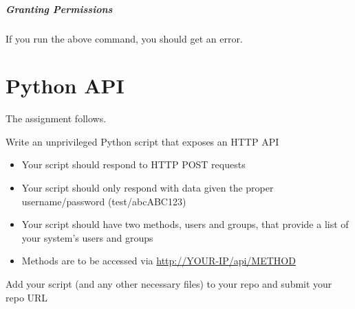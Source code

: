 \documentclass{article}
\begin{document}
\subparagraph{Granting Permissions}

If you run the above command, you should get an error.



\newpage

\section{Python API}

The assignment follows. \vspace{1em}

Write an unprivileged Python script that exposes an HTTP API

\begin{itemize}

	\item

		Your script should respond to HTTP POST requests

	\item

		Your script should only respond with data given the proper
		username/password (test/abcABC123)

	\item

		Your script should have two methods, users and groups, that
		provide a list of your system's users and groups

	\item

		Methods are to be accessed via \url{http://YOUR-IP/api/METHOD}

\end{itemize}

Add your script (and any other necessary files) to your repo and submit your
repo URL
\end{document}
